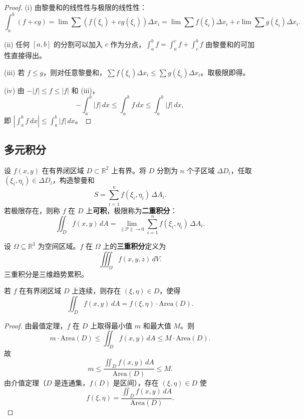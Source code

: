 \begin{proof}
(i) 由黎曼和的线性性与极限的线性性：
\[
\int_a^b (f+cg) = \lim \sum (f(\xi_i) + cg(\xi_i))\Delta x_i = \lim \sum f(\xi_i)\Delta x_i + c\lim \sum g(\xi_i)\Delta x_i.
\]

(ii) 任何 $[a,b]$ 的分割可以加入 $c$ 作为分点，$\int_a^b f = \int_a^c f + \int_c^b f$ 由黎曼和的可加性直接得出。

(iii) 若 $f \le g$，则对任意黎曼和，$\sum f(\xi_i)\Delta x_i \le \sum g(\xi_i)\Delta x_i$。取极限即得。

(iv) 由 $-|f| \le f \le |f|$ 和 (iii)，
\[
-\int_a^b |f|\,dx \le \int_a^b f\,dx \le \int_a^b |f|\,dx,
\]
即 $\left|\int_a^b f\,dx\right| \le \int_a^b |f|\,dx$。
\end{proof}

\subsection{\texorpdfstring{多元积分}{多元积分}}

\begin{definition}[二重积分]\label{def:double_integral}
设 $f(x,y)$ 在有界闭区域 $D \subset \mathbb{R}^2$ 上有界。将 $D$ 分割为 $n$ 个子区域 $\Delta D_i$，任取 $(\xi_i, \eta_i) \in \Delta D_i$，构造黎曼和
\[S = \sum_{i=1}^n f(\xi_i, \eta_i)\,\Delta A_i.\]
若极限存在，则称 $f$ 在 $D$ 上\textbf{可积}，极限称为\textbf{二重积分}：
\[\iint_D f(x,y)\,dA = \lim_{\|\mathcal{P}\| \to 0} \sum_{i=1}^n f(\xi_i, \eta_i)\,\Delta A_i.\]
\end{definition}

\begin{definition}[三重积分]\label{def:triple_integral}
设 $\Omega \subseteq \mathbb{R}^3$ 为空间区域。$f$ 在 $\Omega$ 上的\textbf{三重积分}定义为
\[\iiint_\Omega f(x, y, z)\,dV.\]
三重积分是三维趋势累积。
\end{definition}

\begin{lemma}[积分中值定理]\label{lem:integral_mean_value}
若 $f$ 在有界闭区域 $D$ 上连续，则存在 $(\xi, \eta) \in D$，使得
\[\iint_D f(x,y)\,dA = f(\xi, \eta) \cdot \mathrm{Area}(D).\]
\end{lemma}

\begin{proof}
由最值定理，$f$ 在 $D$ 上取得最小值 $m$ 和最大值 $M$。则
\[
m \cdot \mathrm{Area}(D) \le \iint_D f(x,y)\,dA \le M \cdot \mathrm{Area}(D).
\]
故
\[
m \le \frac{\iint_D f(x,y)\,dA}{\mathrm{Area}(D)} \le M.
\]
由介值定理（$D$ 是连通集，$f(D)$ 是区间），存在 $(\xi, \eta) \in D$ 使
\[
f(\xi, \eta) = \frac{\iint_D f(x,y)\,dA}{\mathrm{Area}(D)}.
\]
\end{proof}

